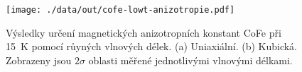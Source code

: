 \begin{figure}[htbp]
    \centering
    \texttt{[image: ./data/out/cofe-lowt-anizotropie.pdf]}
    \caption{Výsledky určení magnetických anizotropních konstant CoFe při \SI{15}{\kelvin} pomocí růyných vlnových délek. (a) Uniaxiální. (b) Kubická. Zobrazeny jsou $2\sigma$ oblasti měřené jednotlivými vlnovými délkami.}
    \label{fig:vysledky-cofe-lowt-anizotropie}
\end{figure}


